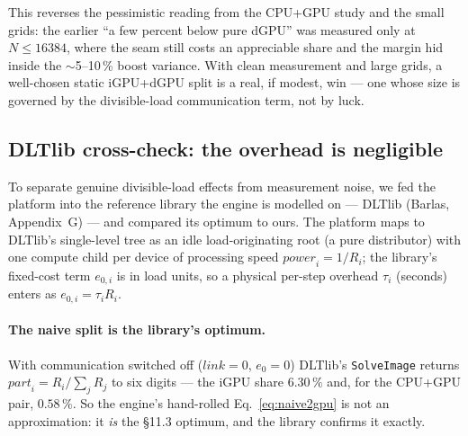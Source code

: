 \documentclass[
	english,
	letterpaper, oneside
]{article}
\begin{document}

This reverses the pessimistic reading from the CPU+GPU study and the small grids: the
earlier ``a few percent below pure dGPU'' was measured only at $N\le 16384$, where the
seam still costs an appreciable share and the margin hid inside the $\sim$5--10\,\%
boost variance. With clean measurement and large grids, a well-chosen static iGPU+dGPU
split is a real, if modest, win --- one whose size is governed by the divisible-load
communication term, not by luck.

\subsection{DLTlib cross-check: the overhead is negligible}
\label{sec:twogpu-dlt}

To separate genuine divisible-load effects from measurement noise, we fed the platform
into the reference library the engine is modelled on --- DLTlib (Barlas, Appendix~G) ---
and compared its optimum to ours. The platform maps to DLTlib's single-level tree as an
idle load-originating root (a pure distributor) with one compute child per device of
processing speed $\mathit{power}_i = 1/R_i$; the library's fixed-cost term $e_{0,i}$ is
in load units, so a physical per-step overhead $\tau_i$ (seconds) enters as
$e_{0,i} = \tau_i R_i$.

\paragraph{The naive split is the library's optimum.} With communication switched off
($\mathit{link}=0$, $e_0=0$) DLTlib's \texttt{SolveImage} returns
$\mathit{part}_i = R_i/\sum_j R_j$ to six digits --- the iGPU share $6.30\,\%$ and, for
the CPU+GPU pair, $0.58\,\%$. So the engine's hand-rolled Eq.~\eqref{eq:naive2gpu} is
not an approximation: it \emph{is} the \S11.3 optimum, and the library confirms it
exactly.
\end{document}
